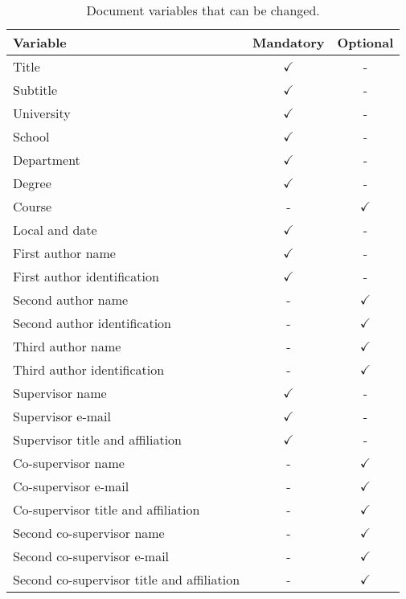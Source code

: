 \begin{table}[!htpb]
    \centering
    \caption{Document variables that can be changed.}
    \label{tab:doc-variables}
    \begin{tabular}{lcc}
        \toprule
            \textbf{Variable} & \textbf{Mandatory} & \textbf{Optional} \\
        \midrule
            Title & $\checkmark$ & - \\
            Subtitle & $\checkmark$ & - \\
            University & $\checkmark$ & - \\
            School & $\checkmark$ & - \\
            Department & $\checkmark$ & - \\
            Degree & $\checkmark$ & - \\
            Course & - & $\checkmark$ \\
            Local and date & $\checkmark$ & - \\ 
            
            First author name & $\checkmark$ & - \\
            First author identification & $\checkmark$ & - \\ 

            Second author name & - & $\checkmark$ \\
            Second author identification & - & $\checkmark$ \\ 

            Third author name & - & $\checkmark$ \\
            Third author identification & - & $\checkmark$ \\ 

            Supervisor name & $\checkmark$ & - \\
            Supervisor e-mail & $\checkmark$ & - \\
            Supervisor title and affiliation & $\checkmark$ & - \\ 

            Co-supervisor name & - & $\checkmark$ \\
            Co-supervisor e-mail & - & $\checkmark$ \\
            Co-supervisor title and affiliation & - & $\checkmark$ \\ 

            Second co-supervisor name & - & $\checkmark$ \\
            Second co-supervisor e-mail & - & $\checkmark$ \\
            Second co-supervisor title and affiliation & - & $\checkmark$ \\
        \bottomrule
    \end{tabular}
\end{table}
